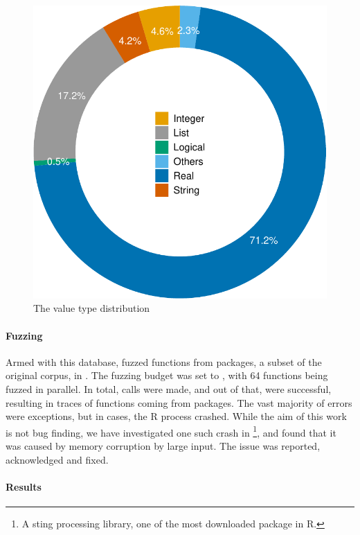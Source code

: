 \documentclass[sigplan,nonacm,anonymous,review]{acmart}
\begin{document}
\begin{figure}
    \centering
    \includegraphics[width=.6\columnwidth]{code-and-figures/argsdb-value-distribution.pdf}
    \vspace{-3mm}
    \caption{The \sxpdb value type distribution}
    \label{fig:argsdb-value-distribution}
\end{figure}

\paragraph{Fuzzing}

Armed with this database, \tool fuzzed \UFNumFunctions functions from \UFNumPackages packages, a subset of the original corpus, in \UFTracingTime.
The fuzzing budget was set to \UFTracingBudget, with 64 functions being fuzzed in parallel.
In total, \UFNumTracesRnd calls were made, and out of that, \UFRatioSucesssTraces were successful, resulting in \UFNumSuccessTraces traces of \UFNumSuccessFunctions functions coming from \UFNumSuccessPackages packages.
The vast majority of errors were exceptions, but in \UFNumCrashedRSessions cases, the R process crashed.
While the aim of this work is not bug finding, we have investigated one such crash in \footnote{A sting processing library, one of the most downloaded package in R.}, and found that it was caused by memory corruption by large input.
The issue was reported, acknowledged and fixed.

\paragraph{Results}
\end{document}
